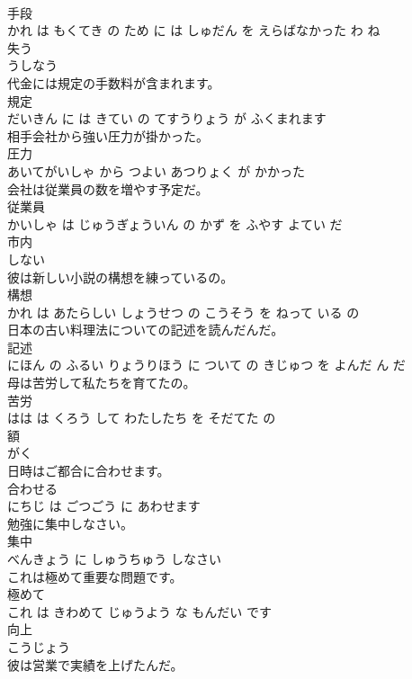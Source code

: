 \documentclass[8pt]{extreport}
\begin{document}
\begin{CJK}{UTF8}{min}
\\	手段 
\\	かれ は もくてき の ため に は しゅだん を えらばなかった わ ね			
\\	失う	
\\	うしなう			
\\	代金には規定の手数料が含まれます。	
\\	規定 
\\	だいきん に は きてい の てすうりょう が ふくまれます			
\\	相手会社から強い圧力が掛かった。	
\\	圧力 
\\	あいてがいしゃ から つよい あつりょく が かかった			
\\	会社は従業員の数を増やす予定だ。	
\\	従業員 
\\	かいしゃ は じゅうぎょういん の かず を ふやす よてい だ			
\\	市内	
\\	しない			
\\	彼は新しい小説の構想を練っているの。	
\\	構想 
\\	かれ は あたらしい しょうせつ の こうそう を ねって いる の			
\\	日本の古い料理法についての記述を読んだんだ。	
\\	記述 
\\	にほん の ふるい りょうりほう に ついて の きじゅつ を よんだ ん だ			
\\	母は苦労して私たちを育てたの。	
\\	苦労 
\\	はは は くろう して わたしたち を そだてた の			
\\	額	
\\	がく			
\\	日時はご都合に合わせます。	
\\	合わせる 
\\	にちじ は ごつごう に あわせます			
\\	勉強に集中しなさい。	
\\	集中 
\\	べんきょう に しゅうちゅう しなさい			
\\	これは極めて重要な問題です。	
\\	極めて 
\\	これ は きわめて じゅうよう な もんだい です			
\\	向上	
\\	こうじょう			
\\	彼は営業で実績を上げたんだ。	

\end{CJK}
\end{document}
